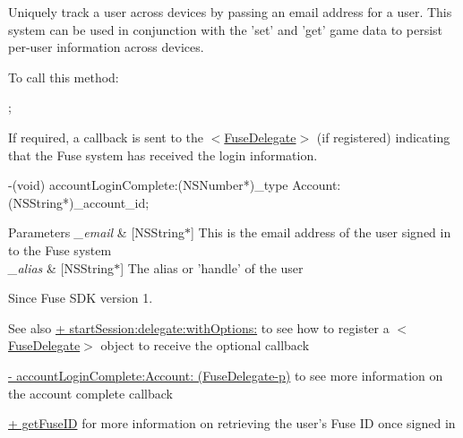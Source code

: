 Uniquely track a user across devices by passing an email address for a user. This system can be used in conjunction with the 'set' and 'get' game data to persist per-\/user information across devices.

To call this method\+:


\begin{DoxyCode}
;
\end{DoxyCode}


If required, a callback is sent to the $<$\hyperlink{protocol_fuse_delegate-p}{Fuse\+Delegate}$>$ (if registered) indicating that the Fuse system has received the login information.


\begin{DoxyCode}
-(void) accountLoginComplete:(NSNumber*)\_type Account:(NSString*)\_account\_id;
\end{DoxyCode}



\begin{DoxyParams}{Parameters}
{\em \+\_\+email} & \mbox{[}N\+S\+String$\ast$\mbox{]} This is the email address of the user signed in to the Fuse system \\
\hline
{\em \+\_\+alias} & \mbox{[}N\+S\+String$\ast$\mbox{]} The alias or 'handle' of the user \\
\hline
\end{DoxyParams}
\begin{DoxySince}{Since}
Fuse S\+D\+K version 1. 
\end{DoxySince}
\begin{DoxySeeAlso}{See also}
\hyperlink{interface_fuse_s_d_k_adf7ed64a02b9540c9ded4b931ea4e400}{+ start\+Session\+:delegate\+:with\+Options\+:} to see how to register a $<$\hyperlink{protocol_fuse_delegate-p}{Fuse\+Delegate}$>$ object to receive the optional callback 

\hyperlink{protocol_fuse_delegate-p_a54a18530604a7ceeb0e9419fc7fa3345}{-\/ account\+Login\+Complete\+:\+Account\+: (\+Fuse\+Delegate-\/p)} to see more information on the account complete callback 

\hyperlink{interface_fuse_s_d_k_ab483c2a3f4439aad8e19200cf24ff731}{+ get\+Fuse\+I\+D} for more information on retrieving the user's Fuse I\+D once signed in 
\end{DoxySeeAlso}
\hypertarget{interface_fuse_s_d_k_a8c0d55b6f8fad28e9cb150271a82df2f}{}
